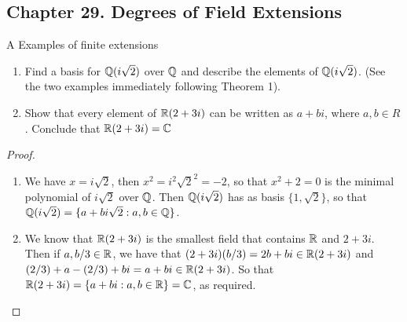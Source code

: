 \subsection*{Chapter 29. Degrees of Field Extensions}


\begin{exercise}{A Examples of finite extensions}
\begin{enumerate}
    \item Find a basis for $\mathbb{Q}(i\sqrt{2})$ over $\mathbb{Q}$ and describe the elements of $\mathbb{Q}(i\sqrt{2})$. (See the two examples immediately following Theorem 1).
    \item Show that every element of $\mathbb{R}(2+3i)$ can be written as $a+bi$, where $a,b\in R$. Conclude that $\mathbb{R}(2+3i)=\mathbb{C}$
\end{enumerate}
\end{exercise}
\begin{proof}
 \begin{enumerate}
     \item We have $x=i\sqrt{2}$, then $x^2=i^2\sqrt{2}^2=-2$, so that $x^2+2=0$ is the minimal polynomial of $i\sqrt{2}$ over $\mathbb{Q}$. Then $\mathbb{Q}(i\sqrt{2})$ has as basis $\{1,\sqrt{2}\}$, so that $\mathbb{Q}(i\sqrt{2})=\{a+bi\sqrt{2}: a,b\in\mathbb{Q}\}$.
     \item We know that $\mathbb{R}(2+3i)$ is the smallest field that contains $\mathbb{R}$ and $2+3i$. Then if $a,b/3\in\mathbb{R}$, we have that $(2+3i)(b/3)= 2b+bi\in\mathbb{R}(2+3i)$ and $(2/3)+a-(2/3)+bi=a+bi\in\mathbb{R}(2+3i)$. So that $\mathbb{R}(2+3i)=\{a+bi: a,b\in\mathbb{R}\}= \mathbb{C}$, as required.
 \end{enumerate}
\end{proof}

